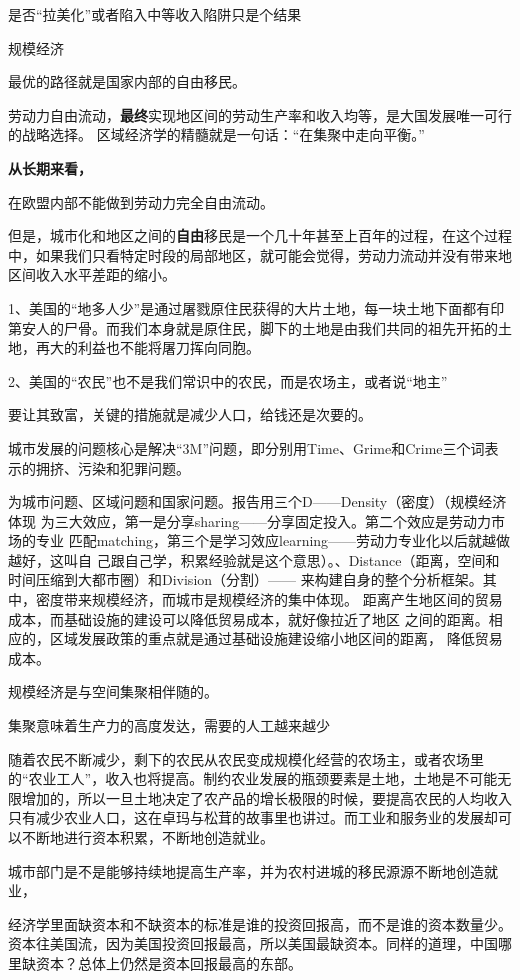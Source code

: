 是否“拉美化”或者陷入中等收入陷阱只是个结果

规模经济

最优的路径就是国家内部的自由移民。

劳动力自由流动，{\bf 最终}实现地区间的劳动生产率和收入均等，是大国发展唯一可行的战略选择。
区域经济学的精髓就是一句话：“在集聚中走向平衡。”

{\bf 从长期来看，}

在欧盟内部不能做到劳动力完全自由流动。


但是，城市化和地区之间的{\bf 自由}移民是一个几十年甚至上百年的过程，在这个过程中，如果我们只看特定时段的局部地区，就可能会觉得，劳动力流动并没有带来地区间收入水平差距的缩小。

1、美国的“地多人少”是通过屠戮原住民获得的大片土地，每一块土地下面都有印第安人的尸骨。而我们本身就是原住民，脚下的土地是由我们共同的祖先开拓的土地，再大的利益也不能将屠刀挥向同胞。

2、美国的“农民”也不是我们常识中的农民，而是农场主，或者说“地主”

要让其致富，关键的措施就是减少人口，给钱还是次要的。

城市发展的问题核心是解决“3M”问题，即分别用Time、Grime和Crime三个词表示的拥挤、污染和犯罪问题。

为城市问题、区域问题和国家问题。报告用三个D——Density（密度）（规模经济体现
为三大效应，第一是分享sharing——分享固定投入。第二个效应是劳动力市场的专业
匹配matching，第三个是学习效应learning——劳动力专业化以后就越做越好，这叫自
己跟自己学，积累经验就是这个意思）。、Distance（距离，空间和时间压缩到大都市圈）和Division（分割）——
来构建自身的整个分析框架。其中，密度带来规模经济，而城市是规模经济的集中体现。
距离产生地区间的贸易成本，而基础设施的建设可以降低贸易成本，就好像拉近了地区
之间的距离。相应的，区域发展政策的重点就是通过基础设施建设缩小地区间的距离，
降低贸易成本。

规模经济是与空间集聚相伴随的。

集聚意味着生产力的高度发达，需要的人工越来越少

随着农民不断减少，剩下的农民从农民变成规模化经营的农场主，或者农场里的“农业工人”，收入也将提高。制约农业发展的瓶颈要素是土地，土地是不可能无限增加的，所以一旦土地决定了农产品的增长极限的时候，要提高农民的人均收入只有减少农业人口，这在卓玛与松茸的故事里也讲过。而工业和服务业的发展却可以不断地进行资本积累，不断地创造就业。

城市部门是不是能够持续地提高生产率，并为农村进城的移民源源不断地创造就业，

经济学里面缺资本和不缺资本的标准是谁的投资回报高，而不是谁的资本数量少。资本往美国流，因为美国投资回报最高，所以美国最缺资本。同样的道理，中国哪里缺资本？总体上仍然是资本回报最高的东部。

